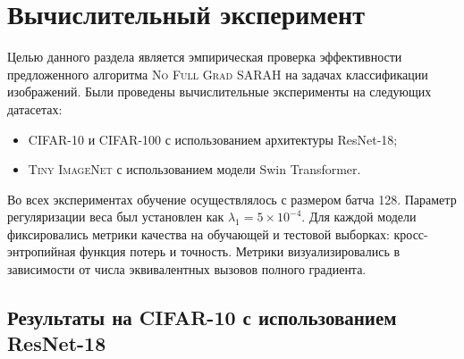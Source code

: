 \section{Вычислительный эксперимент} \label{section:experiments}

Целью данного раздела является эмпирическая проверка эффективности предложенного алгоритма \textsc{No Full Grad SARAH} на задачах классификации изображений. Были проведены вычислительные эксперименты на следующих датасетах:
\begin{itemize}
    \item \textsc{CIFAR-10} и \textsc{CIFAR-100} с использованием архитектуры ResNet-18;
    \item \textsc{Tiny ImageNet} с использованием модели Swin Transformer.
\end{itemize}

Во всех экспериментах обучение осуществлялось  с размером батча 128. Параметр регуляризации веса был установлен как $\lambda_1 = 5 \times 10^{-4}$. Для каждой модели фиксировались метрики качества на обучающей и тестовой выборках: кросс-энтропийная функция потерь и точность. Метрики визуализировались в зависимости от числа эквивалентных вызовов полного градиента.

\subsection{Результаты на \textsc{CIFAR-10} с использованием ResNet-18}

